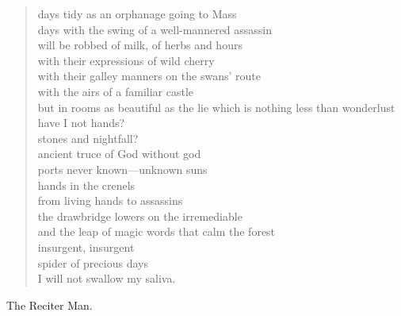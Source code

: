 \documentclass[letterpaper,article,12pt,oneside,notitlepage]{memoir}
\begin{document}
\begin{verse}
days tidy as an orphanage going to Mass \\
days with the swing of a well-mannered assassin \\
will be robbed of milk, of herbs and hours \\
with their expressions of wild cherry \\
with their galley manners on the swans' route \\
with the airs of a familiar castle \\
but in rooms as beautiful as the lie which is nothing less than wonderlust \\
have I not hands? \\
stones and nightfall? \\
ancient truce of God without god \\
ports never known---unknown suns \\
hands in the crenels \\
from living hands to assassins \\
the drawbridge lowers on the irremediable \\
and the leap of magic words that calm the forest \\
insurgent, insurgent \\
spider of precious days \\
I will not swallow my saliva. \\
\end{verse}

\begin{center}The Reciter Man.\end{center}
\end{document}
